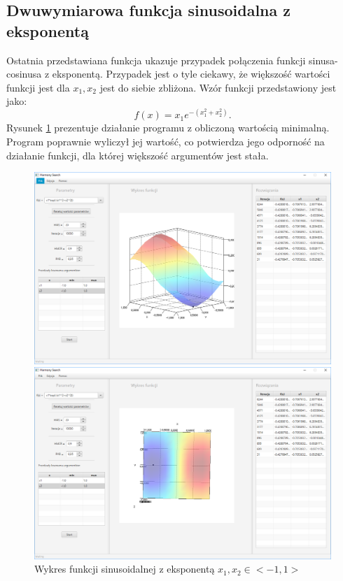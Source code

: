 \documentclass[10pt, a4paper]{article}
\begin{document}
\subsection{Dwuwymiarowa funkcja sinusoidalna z eksponentą}
\label{subsec:sinexp}
Ostatnia przedstawiana funkcja ukazuje przypadek połączenia funkcji sinusa-cosinusa z eksponentą. Przypadek jest o tyle ciekawy, że większość wartości funkcji jest dla {\em $x_{1}, x_{2}$} jest do siebie zbliżona. Wzór funkcji przedstawiony jest jako: $$f(x)=x_{1}e^{-(x_{1}^{2}+x_{2}^2)}.$$ Rysunek \ref{fig:9} prezentuje działanie programu z obliczoną wartością minimalną. Program poprawnie wyliczył jej wartość, co potwierdza jego odporność na działanie funkcji, dla której większość argumentów jest stała. 
\begin{figure}[htbp] 
	\begin{minipage}[b]{1\textwidth}
		\centering
		\includegraphics[width=\linewidth]{images/91.PNG}
	\end{minipage} 
	\begin{minipage}[b]{1\textwidth}
		\centering
		\includegraphics[width=\linewidth]{images/92.PNG} 
	\end{minipage}
	\caption{Wykres funkcji sinusoidalnej z eksponentą $x_{1}, x_{2} \in <-1,1>$}
	\label{fig:9}
\end{figure}
\end{document}

